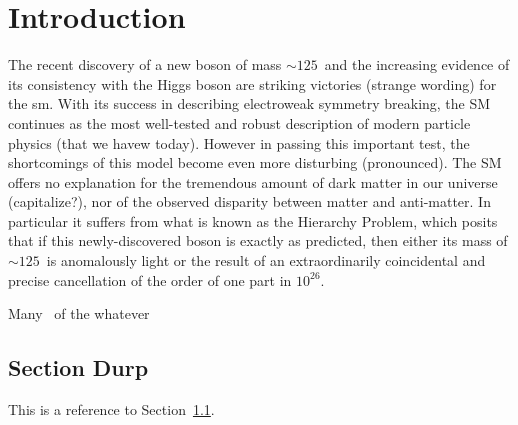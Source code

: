 \chapter{Introduction}
\label{intro}

The recent discovery of a new boson of mass ${\sim}125$~\GeVcc and the
increasing evidence of its consistency with the Higgs boson are
striking victories (strange wording) for the \acrfull{sm}. With its success in describing
electroweak symmetry breaking, the SM continues as the most
well-tested and robust description of modern particle physics (that we
havew today). However in
passing this important test, the shortcomings of this model become
even more disturbing (pronounced). The SM offers no explanation for the tremendous
amount of dark matter in our universe (capitalize?), nor of the observed disparity
between matter and anti-matter. In particular it suffers from what is
known as the Hierarchy Problem, which posits that if this
newly-discovered boson is exactly as predicted, then
either its mass of ${\sim}125$~\GeVcc is anomalously light or the
result of an extraordinarily coincidental and precise cancellation of
the order of one part in $10^{26}$.

Many~\cite{CMS:2012discovery} of the whatever


\section{Section Durp}
\label{sectiondurp}

This is a reference to Section~\ref{sectiondurp}.